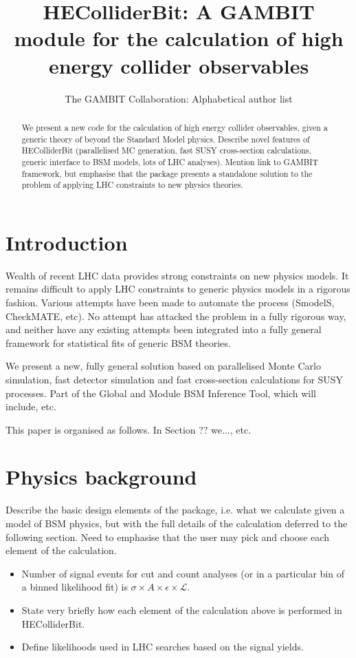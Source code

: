 \documentclass[11pt,a4paper]{article}
\title{HEColliderBit: A GAMBIT module for the calculation of high energy collider observables}
\author{The GAMBIT Collaboration: Alphabetical author list} %
\begin{document}
\maketitle

\begin{abstract}
We present a new code for the calculation of high energy collider observables, given a generic theory of beyond the Standard Model physics. Describe novel features of HEColliderBit (parallelised MC generation, fast SUSY cross-section calculations, generic interface to BSM models, lots of LHC analyses). Mention link to GAMBIT framework, but emphasise that the package presents a standalone solution to the problem of applying LHC constraints to new physics theories.
\end{abstract}

\section{Introduction}

Wealth of recent LHC data provides strong constraints on new physics models. It remains difficult to apply LHC constraints to generic physics models in a rigorous fashion. Various attempts have been made to automate the process (SmodelS, CheckMATE, etc). No attempt has attacked the problem in a fully rigorous way, and neither have any existing attempts been integrated into a fully general framework for statistical fits of generic BSM theories. 

We present a new, fully general solution based on parallelised Monte Carlo simulation, fast detector simulation and fast cross-section calculations for SUSY processes. Part of the Global and Module BSM Inference Tool, which will include, etc. 

This paper is organised as follows. In Section ?? we..., etc. 

\section{Physics background}
Describe the basic design elements of the package, i.e. what we calculate given a model of BSM physics, but with the full details of the calculation deferred to the following section. Need to emphasise that the user may pick and choose each element of the calculation.

\begin{itemize}
\item Number of signal events for cut and count analyses (or in a particular bin of a binned likelihood fit) is $\sigma \times A \times \epsilon \times \mathcal{L}$.
\item State very briefly how each element of the calculation above is performed in HEColliderBit.
\item Define likelihoods used in LHC searches based on the signal yields.
\end{itemize}
\end{document}
